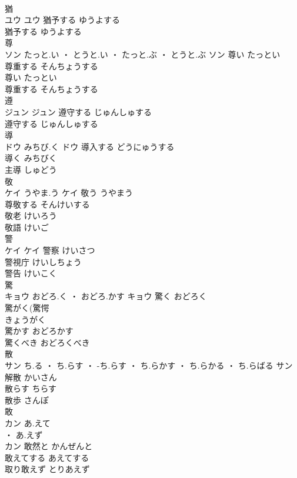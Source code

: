 \documentclass[8pt]{extreport}
\begin{document}
\begin{CJK}{UTF8}{min}
\\	猶	
\\	ユウ		ユウ	猶予する	ゆうよする	
\\	猶予する	ゆうよする	
\\	尊	
\\	ソン	たっと.い ・ とうと.い ・ たっと.ぶ ・ とうと.ぶ	ソン	尊い	たっとい	
\\	尊重する	そんちょうする	
\\	尊い	たっとい	
\\	尊重する	そんちょうする	
\\	遵	
\\	ジュン		ジュン	遵守する	じゅんしゅする	
\\	遵守する	じゅんしゅする	
\\	導	
\\	ドウ	みちび.く	ドウ	導入する	どうにゅうする	
\\	導く	みちびく	
\\	主導	しゅどう	
\\	敬	
\\	ケイ	うやま.う	ケイ	敬う	うやまう	
\\	尊敬する	そんけいする	
\\	敬老	けいろう	
\\	敬語	けいご	
\\	警	
\\	ケイ		ケイ	警察	けいさつ	
\\	警視庁	けいしちょう	
\\	警告	けいこく	
\\	驚	
\\	キョウ	おどろ.く ・ おどろ.かす	キョウ	驚く	おどろく	
\\	驚がく(驚愕
\\	きょうがく	
\\	驚かす	おどろかす	
\\	驚くべき	おどろくべき	
\\	散	
\\	サン	ち.る ・ ち.らす ・ -ち.らす ・ ち.らかす ・ ち.らかる ・ ち.らばる	サン	解散	かいさん	
\\	散らす	ちらす	
\\	散歩	さんぽ	
\\	敢	
\\	カン	あ.えて
\\	・ あ.えず
\\	カン	敢然と	かんぜんと	
\\	敢えてする	あえてする	
\\	取り敢えず	とりあえず	

\end{CJK}
\end{document}
